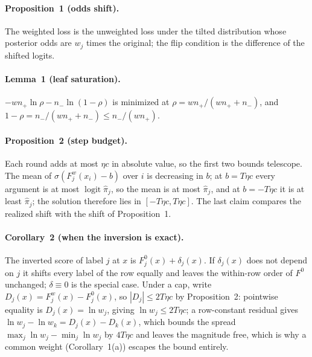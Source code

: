 \documentclass[sigconf,nonacm]{acmart}
\begin{document}
\paragraph{Proposition~1 (odds shift).} The weighted loss is the unweighted loss under the tilted distribution whose posterior odds are $w_j$ times the original; the flip condition is the difference of the shifted logits.

\paragraph{Lemma~1 (leaf saturation).} $-wn_+\ln\rho-n_-\ln(1-\rho)$ is minimized at $\rho=wn_+/(wn_++n_-)$, and $1-\rho=n_-/(wn_++n_-)\le n_-/(wn_+)$.

\paragraph{Proposition~2 (step budget).} Each round adds at most $\eta c$ in absolute value, so the first two bounds telescope. The mean of $\sigma(F^{w}_j(x_i)-b)$ over $i$ is decreasing in $b$; at $b=T\eta c$ every argument is at most $\operatorname{logit}\hat\pi_j$, so the mean is at most $\hat\pi_j$, and at $b=-T\eta c$ it is at least $\hat\pi_j$; the solution therefore lies in $[-T\eta c,T\eta c]$. The last claim compares the realized shift with the shift of Proposition~1.

\paragraph{Corollary~2 (when the inversion is exact).} The inverted score of label $j$ at $x$ is $F^{0}_j(x)+\delta_j(x)$. If $\delta_j(x)$ does not depend on $j$ it shifts every label of the row equally and leaves the within-row order of $F^{0}$ unchanged; $\delta\equiv0$ is the special case. Under a cap, write $D_j(x)=F^{w}_j(x)-F^{0}_j(x)$, so $|D_j|\le 2T\eta c$ by Proposition~2: pointwise equality is $D_j(x)=\ln w_j$, giving $\ln w_j\le 2T\eta c$; a row-constant residual gives $\ln w_j-\ln w_k=D_j(x)-D_k(x)$, which bounds the spread $\max_j\ln w_j-\min_j\ln w_j$ by $4T\eta c$ and leaves the magnitude free, which is why a common weight (Corollary~1(a)) escapes the bound entirely.



\end{document}
